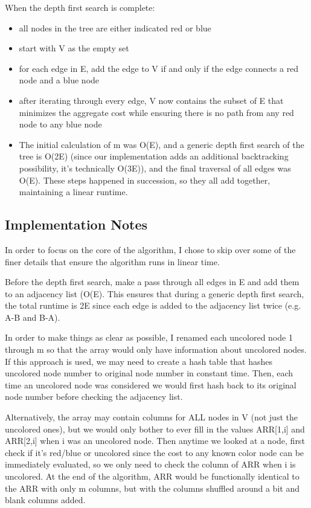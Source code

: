 \documentclass[a4paper]{article}
\begin{document}
When the depth first search is complete:
        
\begin{itemize}
    \item all nodes in the tree are either indicated red or blue
    \item start with V as the empty set
    \item for each edge in E, add the edge to V if and only if the edge connects a red node and a blue node
    \item after iterating through every edge, V now contains the subset of E that minimizes the aggregate cost while ensuring there is no path from any red node to any blue node
    \item The initial calculation of m was O(E), and a generic depth first search of the tree is O(2E) (since our implementation adds an additional backtracking possibility, it's technically O(3E)), and the final traversal of all edges was O(E). These steps happened in succession, so they all add together, maintaining a linear runtime.
\end{itemize}

\subsection{Implementation Notes}
In order to focus on the core of the algorithm, I chose to skip over some of the finer details that ensure the algorithm runs in linear time.

Before the depth first search, make a pass through all edges in E and add them to an adjacency list (O(E). This ensures that during a generic depth first search, the total runtime is 2E since each edge is added to the adjacency list twice (e.g. A-B and B-A).

In order to make things as clear as possible, I renamed each uncolored node 1 through m so that the array would only have information about uncolored nodes. If this approach is used, we may need to create a hash table that hashes uncolored node number to original node number in constant time. Then, each time an uncolored node was considered we would first hash back to its original node number before checking the adjacency list.

Alternatively, the array may contain columns for ALL nodes in V (not just the uncolored ones), but we would only bother to ever fill in the values ARR[1,i] and ARR[2,i] when i was an uncolored node. Then anytime we looked at a node, first check if it's red/blue or uncolored since the cost to any known color node can be immediately evaluated, so we only need to check the column of ARR when i is uncolored. At the end of the algorithm, ARR would be functionally identical to the ARR with only m columns, but with the columns shuffled around a bit and blank columns added.
\end{document}

